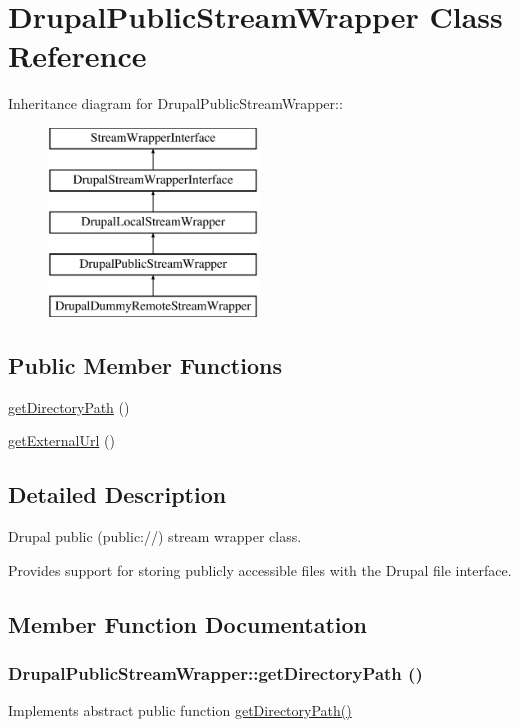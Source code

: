 \hypertarget{classDrupalPublicStreamWrapper}{
\section{DrupalPublicStreamWrapper Class Reference}
\label{classDrupalPublicStreamWrapper}
}
Inheritance diagram for DrupalPublicStreamWrapper::\begin{figure}[H]
\begin{center}
\leavevmode
\includegraphics[height=5cm]{classDrupalPublicStreamWrapper}
\end{center}
\end{figure}
\subsection*{Public Member Functions}
\begin{DoxyCompactItemize}
\item 
\hyperlink{classDrupalPublicStreamWrapper_a2f5fad5a55e907929cae5cd18ab9d151}{getDirectoryPath} ()
\item 
\hyperlink{classDrupalPublicStreamWrapper_a226f45aed9d947aa34aa0b3c7053fdaf}{getExternalUrl} ()
\end{DoxyCompactItemize}


\subsection{Detailed Description}
Drupal public (public://) stream wrapper class.

Provides support for storing publicly accessible files with the Drupal file interface. 

\subsection{Member Function Documentation}
\hypertarget{classDrupalPublicStreamWrapper_a2f5fad5a55e907929cae5cd18ab9d151}{
\subsubsection[{getDirectoryPath}]{\setlength{\rightskip}{0pt plus 5cm}DrupalPublicStreamWrapper::getDirectoryPath ()}}
\label{classDrupalPublicStreamWrapper_a2f5fad5a55e907929cae5cd18ab9d151}
Implements abstract public function \hyperlink{classDrupalPublicStreamWrapper_a2f5fad5a55e907929cae5cd18ab9d151}{getDirectoryPath()} 


